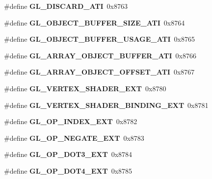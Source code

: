 \begin{DoxyCompactItemize}
\item 
\#define {\bfseries G\+L\+\_\+\+D\+I\+S\+C\+A\+R\+D\+\_\+\+A\+T\+I}~0x8763\label{_s_d_l__opengl_8h_a703dead2340f8d73cced27ea64df09e2}

\item 
\#define {\bfseries G\+L\+\_\+\+O\+B\+J\+E\+C\+T\+\_\+\+B\+U\+F\+F\+E\+R\+\_\+\+S\+I\+Z\+E\+\_\+\+A\+T\+I}~0x8764\label{_s_d_l__opengl_8h_a47668fc6d0e4914fab72354203a44f4f}

\item 
\#define {\bfseries G\+L\+\_\+\+O\+B\+J\+E\+C\+T\+\_\+\+B\+U\+F\+F\+E\+R\+\_\+\+U\+S\+A\+G\+E\+\_\+\+A\+T\+I}~0x8765\label{_s_d_l__opengl_8h_a3043243a3dc062880f80a4f738fc50f2}

\item 
\#define {\bfseries G\+L\+\_\+\+A\+R\+R\+A\+Y\+\_\+\+O\+B\+J\+E\+C\+T\+\_\+\+B\+U\+F\+F\+E\+R\+\_\+\+A\+T\+I}~0x8766\label{_s_d_l__opengl_8h_adacb3c6c1a78e2ad0abbcf8a16c5309a}

\item 
\#define {\bfseries G\+L\+\_\+\+A\+R\+R\+A\+Y\+\_\+\+O\+B\+J\+E\+C\+T\+\_\+\+O\+F\+F\+S\+E\+T\+\_\+\+A\+T\+I}~0x8767\label{_s_d_l__opengl_8h_a329a0d52b40358ca2bc25fb6cbe883d6}

\item 
\#define {\bfseries G\+L\+\_\+\+V\+E\+R\+T\+E\+X\+\_\+\+S\+H\+A\+D\+E\+R\+\_\+\+E\+X\+T}~0x8780\label{_s_d_l__opengl_8h_aa5a0abc881f5bd62b555b8535a09caa0}

\item 
\#define {\bfseries G\+L\+\_\+\+V\+E\+R\+T\+E\+X\+\_\+\+S\+H\+A\+D\+E\+R\+\_\+\+B\+I\+N\+D\+I\+N\+G\+\_\+\+E\+X\+T}~0x8781\label{_s_d_l__opengl_8h_ad637a1137c62a92de45cde3c5a8f2423}

\item 
\#define {\bfseries G\+L\+\_\+\+O\+P\+\_\+\+I\+N\+D\+E\+X\+\_\+\+E\+X\+T}~0x8782\label{_s_d_l__opengl_8h_a1e66a8915d33794ca994175afc83cb27}

\item 
\#define {\bfseries G\+L\+\_\+\+O\+P\+\_\+\+N\+E\+G\+A\+T\+E\+\_\+\+E\+X\+T}~0x8783\label{_s_d_l__opengl_8h_a5aab8486855dd3b5460e0e9829502a9e}

\item 
\#define {\bfseries G\+L\+\_\+\+O\+P\+\_\+\+D\+O\+T3\+\_\+\+E\+X\+T}~0x8784\label{_s_d_l__opengl_8h_a83b38360754c95dcc782aa41d72a7aa7}

\item 
\#define {\bfseries G\+L\+\_\+\+O\+P\+\_\+\+D\+O\+T4\+\_\+\+E\+X\+T}~0x8785\label{_s_d_l__opengl_8h_a31d1bb16f460be5f7da522c839de0ff9}


\end{DoxyCompactItemize}
